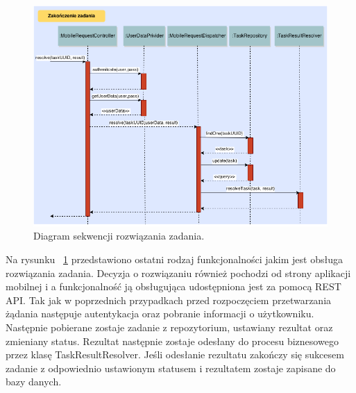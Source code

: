 \begin{figure}[h]
\centerline{\includegraphics[scale=0.5]{resolveTaskFlow}}
\caption{Diagram sekwencji rozwiązania zadania.}
\label{fig:resolveTaskFlow}
\end{figure}

Na rysunku ~\ref{fig:resolveTaskFlow} przedstawiono ostatni rodzaj funkcjonalności jakim jest obsługa rozwiązania zadania. Decyzja o rozwiązaniu również pochodzi od strony aplikacji mobilnej i a funkcjonalność ją obsługująca udostępniona jest za pomocą REST API. Tak jak w poprzednich przypadkach przed rozpoczęciem przetwarzania żądania następuje autentykacja oraz pobranie informacji o użytkowniku. Następnie pobierane zostaje zadanie z repozytorium, ustawiany rezultat oraz zmieniany status. Rezultat następnie zostaje odesłany do procesu biznesowego przez klasę TaskResultResolver. Jeśli odesłanie rezultatu zakończy się sukcesem zadanie z odpowiednio ustawionym statusem i rezultatem zostaje zapisane do bazy danych.
